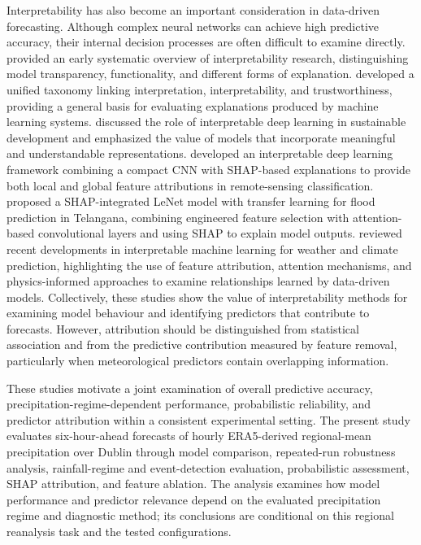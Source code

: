 Interpretability has also become an important consideration in data-driven forecasting. Although complex neural networks can achieve high predictive accuracy, their internal decision processes are often difficult to examine directly. \citet{chakraborty2017interpretability} provided an early systematic overview of interpretability research, distinguishing model transparency, functionality, and different forms of explanation. \citet{li2022interpretable} developed a unified taxonomy linking interpretation, interpretability, and trustworthiness, providing a general basis for evaluating explanations produced by machine learning systems. \citet{vinuesa2021interpretable} discussed the role of interpretable deep learning in sustainable development and emphasized the value of models that incorporate meaningful and understandable representations. \citet{temenos2023interpretable} developed an interpretable deep learning framework combining a compact CNN with SHAP-based explanations to provide both local and global feature attributions in remote-sensing classification. \citet{yoganand2026shap} proposed a SHAP-integrated LeNet model with transfer learning for flood prediction in Telangana, combining engineered feature selection with attention-based convolutional layers and using SHAP to explain model outputs. \citet{yang2024interpretable} reviewed recent developments in interpretable machine learning for weather and climate prediction, highlighting the use of feature attribution, attention mechanisms, and physics-informed approaches to examine relationships learned by data-driven models. Collectively, these studies show the value of interpretability methods for examining model behaviour and identifying predictors that contribute to forecasts. However, attribution should be distinguished from statistical association and from the predictive contribution measured by feature removal, particularly when meteorological predictors contain overlapping information.

These studies motivate a joint examination of overall predictive accuracy, precipitation-regime-dependent performance, probabilistic reliability, and predictor attribution within a consistent experimental setting. The present study evaluates six-hour-ahead forecasts of hourly ERA5-derived regional-mean precipitation over Dublin through model comparison, repeated-run robustness analysis, rainfall-regime and event-detection evaluation, probabilistic assessment, SHAP attribution, and feature ablation. The analysis examines how model performance and predictor relevance depend on the evaluated precipitation regime and diagnostic method; its conclusions are conditional on this regional reanalysis task and the tested configurations.

